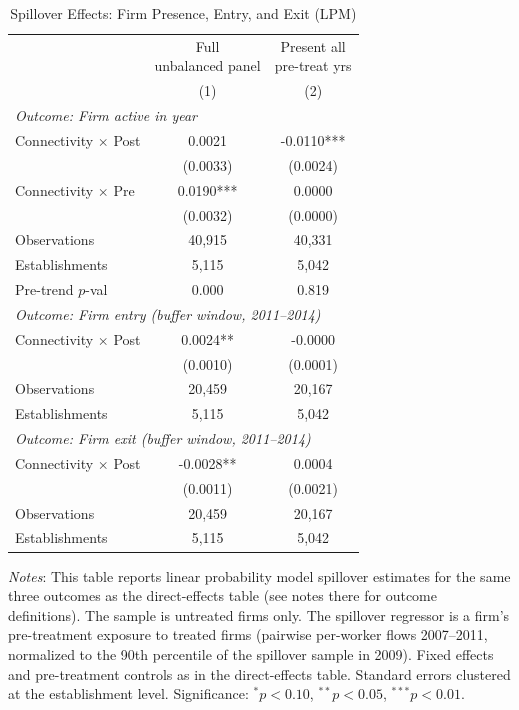 \begin{table}[H]
\centering
\scriptsize
\caption{Spillover Effects: Firm Presence, Entry, and Exit (LPM)}
\begin{tabular}{lcc}
\toprule
& \shortstack{Full\\unbalanced panel} & \shortstack{Present all\\pre-treat yrs} \\
& (1) & (2) \\
\midrule
\multicolumn{3}{l}{\textit{Outcome: Firm active in year}} \\
Connectivity $\times$ Post & 0.0021 & -0.0110*** \\
& (0.0033) & (0.0024) \\[3pt]
Connectivity $\times$ Pre & 0.0190*** & 0.0000 \\
& (0.0032) & (0.0000) \\[3pt]
Observations   & 40,915 & 40,331 \\
Establishments & 5,115 & 5,042 \\
Pre-trend $p$-val & 0.000 & 0.819 \\
\midrule
\multicolumn{3}{l}{\textit{Outcome: Firm entry (buffer window, 2011--2014)}} \\
Connectivity $\times$ Post & 0.0024** & -0.0000 \\
& (0.0010) & (0.0001) \\[3pt]
Observations   & 20,459 & 20,167 \\
Establishments & 5,115 & 5,042 \\
\midrule
\multicolumn{3}{l}{\textit{Outcome: Firm exit (buffer window, 2011--2014)}} \\
Connectivity $\times$ Post & -0.0028** & 0.0004 \\
& (0.0011) & (0.0021) \\[3pt]
Observations   & 20,459 & 20,167 \\
Establishments & 5,115 & 5,042 \\
\bottomrule
\end{tabular}
\begin{minipage}{\textwidth}
\footnotesize
\medskip
\textit{Notes}: This table reports linear probability model spillover estimates for the same three outcomes as the direct-effects table (see notes there for outcome definitions). The sample is untreated firms only. The spillover regressor is a firm's pre-treatment exposure to treated firms (pairwise per-worker flows 2007--2011, normalized to the 90th percentile of the spillover sample in 2009). Fixed effects and pre-treatment controls as in the direct-effects table. Standard errors clustered at the establishment level. Significance: $^{*}p{<}0.10$, $^{**}p{<}0.05$, $^{***}p{<}0.01$.
\end{minipage}
\end{table}
